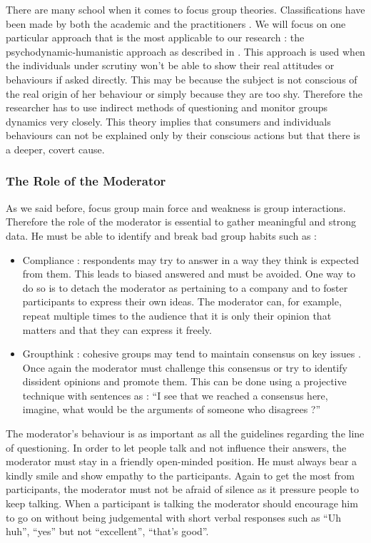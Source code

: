 \documentclass[10pt]{report}
\begin{document}
There are many school when it comes to focus group theories. Classifications have been made by both the academic \autocite{Calder1977} and the practitioners \autocite{Imms2002}. We will focus on one particular approach that is the most applicable to our research : the psychodynamic-humanistic approach as described in \cite{belk2007handbook}. This approach is used when the individuals under scrutiny won't be able to show their real attitudes or behaviours if asked directly. This may be because the subject is not conscious of the real origin of her behaviour or simply because they are too shy. Therefore the researcher has to use indirect methods of questioning and monitor groups dynamics very closely. This theory implies that consumers and individuals behaviours can not be explained only by their conscious actions but that there is a deeper, covert cause.

\subsubsection{The Role of the Moderator}

As we said before, focus group main force and weakness is group interactions. Therefore the role of the moderator is essential to gather meaningful and strong data. He must be able to identify and break bad group habits such as :
\begin{itemize}
\item Compliance : respondents may try to answer in a way they think is expected from them. This leads to biased answered and must be avoided. One way to do so is to detach the moderator as pertaining to a company and to foster participants to express their own ideas. The moderator can, for example, repeat multiple times to the audience that it is only their opinion that matters and that they can express it freely.
\item Groupthink : cohesive groups may tend to maintain consensus on key issues \autocite{Janis1982}. Once again the moderator must challenge this consensus or try to identify dissident opinions and promote them. This can be done using a projective technique with sentences as : \enquote{I see that we reached a consensus here, imagine, what would be the arguments of someone who disagrees ?}
\end{itemize}

The moderator's behaviour is as important as all the guidelines regarding the line of questioning. In order to let people talk and not influence their answers, the moderator must stay in a friendly open-minded position. He must always bear a kindly smile and show empathy to the participants. Again to get the most from participants, the moderator must not be afraid of silence as it pressure people to keep talking. When a participant is talking the moderator should encourage him to go on without being judgemental with short verbal responses such as \enquote{Uh huh}, \enquote{yes} but not \enquote{excellent}, \enquote{that's good}.
\end{document}
